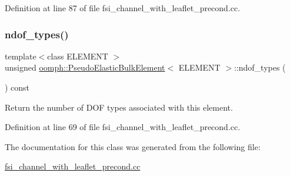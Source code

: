 Definition at line 87 of file fsi\+\_\+channel\+\_\+with\+\_\+leaflet\+\_\+precond.\+cc.

\mbox{\label{classoomph_1_1PseudoElasticBulkElement_a18674d52b96db8800d31e89ffd465175}} 
\subsubsection{\texorpdfstring{ndof\+\_\+types()}{ndof\_types()}}
{\footnotesize\ttfamily template$<$class E\+L\+E\+M\+E\+NT $>$ \\
unsigned \hyperlink{classoomph_1_1PseudoElasticBulkElement}{oomph\+::\+Pseudo\+Elastic\+Bulk\+Element}$<$ E\+L\+E\+M\+E\+NT $>$\+::ndof\+\_\+types (\begin{DoxyParamCaption}{ }\end{DoxyParamCaption}) const\hspace{0.3cm}{\ttfamily [inline]}}



Return the number of D\+OF types associated with this element. 



Definition at line 69 of file fsi\+\_\+channel\+\_\+with\+\_\+leaflet\+\_\+precond.\+cc.



The documentation for this class was generated from the following file\+:\begin{DoxyCompactItemize}
\item 
\hyperlink{fsi__channel__with__leaflet__precond_8cc}{fsi\+\_\+channel\+\_\+with\+\_\+leaflet\+\_\+precond.\+cc}\end{DoxyCompactItemize}
